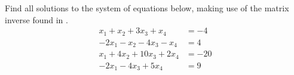 Find all solutions to the system of equations below, making use of the matrix inverse found in .
%
\begin{align*}
x_1+x_2+3x_3+x_4&=-4\\
 -2x_1-x_2-4x_3-x_4&=4\\
 x_1+4x_2+10x_3+2x_4&=-20\\
 -2x_1-4x_3+5x_4&=9
\end{align*}